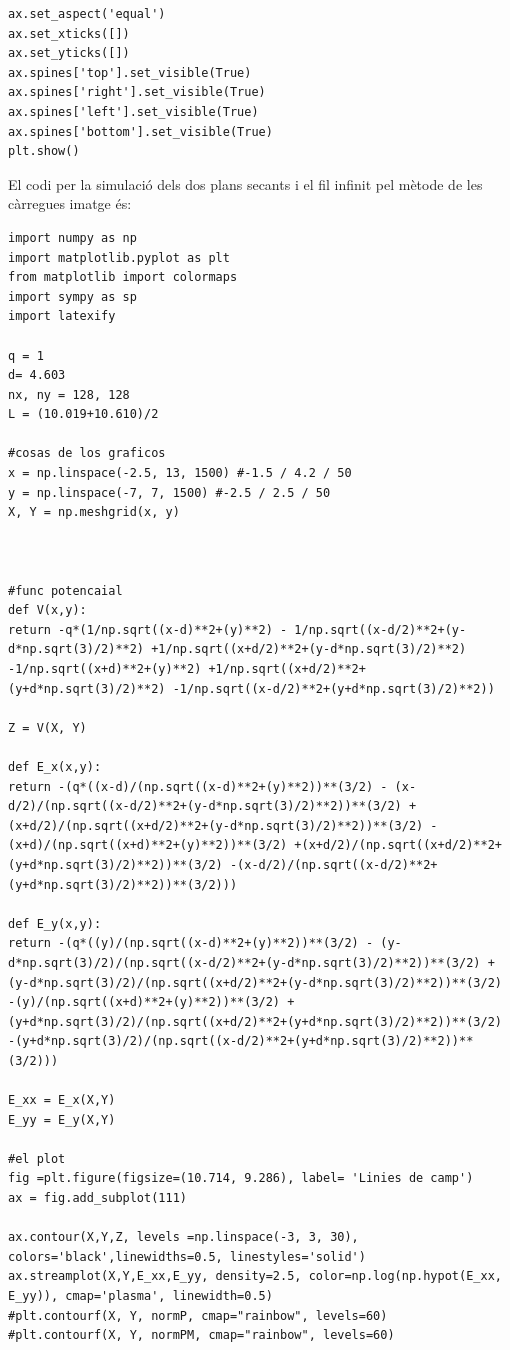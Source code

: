 \documentclass[a4paper,10.5pt]{report}
\begin{document}
\begin{appendices}
\begin{lstlisting}
ax.set_aspect('equal')
ax.set_xticks([])
ax.set_yticks([])
ax.spines['top'].set_visible(True)
ax.spines['right'].set_visible(True)
ax.spines['left'].set_visible(True)
ax.spines['bottom'].set_visible(True)
plt.show()
\end{lstlisting}

El codi per la simulació dels dos plans secants i el fil infinit pel mètode de les càrregues imatge és:
\begin{lstlisting}
import numpy as np
import matplotlib.pyplot as plt
from matplotlib import colormaps
import sympy as sp
import latexify

q = 1
d= 4.603
nx, ny = 128, 128
L = (10.019+10.610)/2

#cosas de los graficos
x = np.linspace(-2.5, 13, 1500) #-1.5 / 4.2 / 50
y = np.linspace(-7, 7, 1500) #-2.5 / 2.5 / 50
X, Y = np.meshgrid(x, y)



#func potencaial
def V(x,y):
return -q*(1/np.sqrt((x-d)**2+(y)**2) - 1/np.sqrt((x-d/2)**2+(y-d*np.sqrt(3)/2)**2) +1/np.sqrt((x+d/2)**2+(y-d*np.sqrt(3)/2)**2) -1/np.sqrt((x+d)**2+(y)**2) +1/np.sqrt((x+d/2)**2+(y+d*np.sqrt(3)/2)**2) -1/np.sqrt((x-d/2)**2+(y+d*np.sqrt(3)/2)**2))

Z = V(X, Y)

def E_x(x,y):
return -(q*((x-d)/(np.sqrt((x-d)**2+(y)**2))**(3/2) - (x-d/2)/(np.sqrt((x-d/2)**2+(y-d*np.sqrt(3)/2)**2))**(3/2) +(x+d/2)/(np.sqrt((x+d/2)**2+(y-d*np.sqrt(3)/2)**2))**(3/2) -(x+d)/(np.sqrt((x+d)**2+(y)**2))**(3/2) +(x+d/2)/(np.sqrt((x+d/2)**2+(y+d*np.sqrt(3)/2)**2))**(3/2) -(x-d/2)/(np.sqrt((x-d/2)**2+(y+d*np.sqrt(3)/2)**2))**(3/2)))

def E_y(x,y):
return -(q*((y)/(np.sqrt((x-d)**2+(y)**2))**(3/2) - (y-d*np.sqrt(3)/2)/(np.sqrt((x-d/2)**2+(y-d*np.sqrt(3)/2)**2))**(3/2) +(y-d*np.sqrt(3)/2)/(np.sqrt((x+d/2)**2+(y-d*np.sqrt(3)/2)**2))**(3/2) -(y)/(np.sqrt((x+d)**2+(y)**2))**(3/2) +(y+d*np.sqrt(3)/2)/(np.sqrt((x+d/2)**2+(y+d*np.sqrt(3)/2)**2))**(3/2) -(y+d*np.sqrt(3)/2)/(np.sqrt((x-d/2)**2+(y+d*np.sqrt(3)/2)**2))**(3/2)))

E_xx = E_x(X,Y)
E_yy = E_y(X,Y)

#el plot
fig =plt.figure(figsize=(10.714, 9.286), label= 'Linies de camp') 
ax = fig.add_subplot(111)

ax.contour(X,Y,Z, levels =np.linspace(-3, 3, 30), colors='black',linewidths=0.5, linestyles='solid')
ax.streamplot(X,Y,E_xx,E_yy, density=2.5, color=np.log(np.hypot(E_xx, E_yy)), cmap='plasma', linewidth=0.5)
#plt.contourf(X, Y, normP, cmap="rainbow", levels=60)
#plt.contourf(X, Y, normPM, cmap="rainbow", levels=60)



\end{lstlisting}
\end{appendices}
\end{document}
